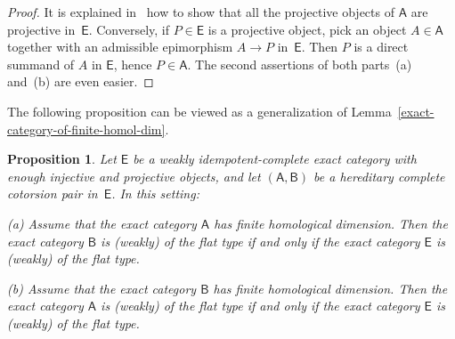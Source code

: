 \documentclass[12pt,a4paper]{amsart}
\newcommand{\+}{\nobreakdash-}
\renewcommand{\:}{\colon}
\newcommand{\rarrow}{\longrightarrow}
\newcommand{\sA}{\mathsf A}
\newcommand{\sB}{\mathsf B}
\newcommand{\sE}{\mathsf E}
\theoremstyle{plain}
\newtheorem{prop}[thm]{Proposition}
\theoremstyle{definition}
\begin{document}
\begin{proof}
 It is explained in~\cite[first paragraph of the proof of
Proposition~B.7.9]{Pcosh} how to show that all the projective objects
of $\sA$ are projective in~$\sE$.
 Conversely, if $P\in\sE$ is a projective object, pick an object
$A\in\sA$ together with an admissible epimorphism $A\rarrow P$ in~$\sE$.
 Then $P$ is a direct summand of $A$ in $\sE$, hence $P\in\sA$.
 The second assertions of both parts~(a) and~(b) are even easier.
\end{proof}

 The following proposition can be viewed as a generalization of
Lemma~\ref{exact-category-of-finite-homol-dim}.

\begin{prop} \label{flat-type-equivalence-for-cotorsion-pair-prop}
 Let\/ $\sE$ be a weakly idempotent-complete exact category with
enough injective and projective objects, and let $(\sA,\sB)$ be
a hereditary complete cotorsion pair in\/~$\sE$.
 In this setting: \par
\textup{(a)} Assume that the exact category\/ $\sA$ has finite
homological dimension.
 Then the exact category\/ $\sB$ is (weakly) of the flat type if and
only if the exact category\/ $\sE$ is (weakly) of the flat type. \par
\textup{(b)} Assume that the exact category\/ $\sB$ has finite
homological dimension.
 Then the exact category\/ $\sA$ is (weakly) of the flat type if and
only if the exact category\/ $\sE$ is (weakly) of the flat type.
\end{prop}
\end{document}
